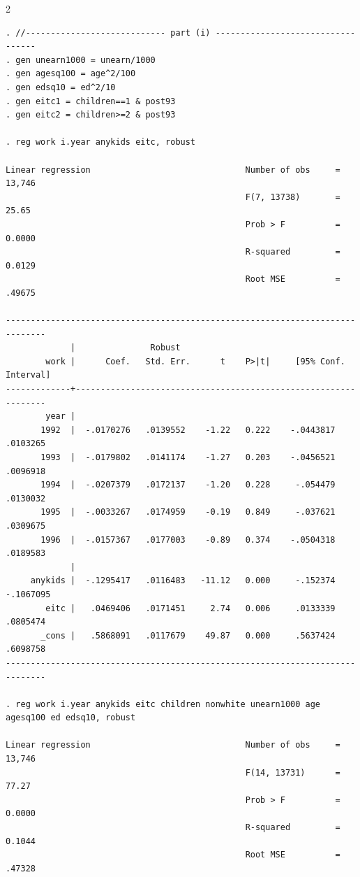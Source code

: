 \documentclass{article}
\newenvironment{changemargin}[2]{%
\begin{list}{}{%
\setlength{\topsep}{0pt}%
\setlength{\leftmargin}{#1}%
\setlength{\rightmargin}{#2}%
\setlength{\listparindent}{\parindent}%
\setlength{\itemindent}{\parindent}%
\setlength{\parsep}{\parskip}%
}%
\item[]}{\end{list}}
\begin{document}
\begin{changemargin}{-0.5in}{-0.5in}
\begin{multicols}{2}
\begin{verbatim}
. //---------------------------- part (i) ----------------------------------
. gen unearn1000 = unearn/1000  
. gen agesq100 = age^2/100 
. gen edsq10 = ed^2/10   
. gen eitc1 = children==1 & post93  
. gen eitc2 = children>=2 & post93

. reg work i.year anykids eitc, robust

Linear regression                               Number of obs     =     13,746
                                                F(7, 13738)       =      25.65
                                                Prob > F          =     0.0000
                                                R-squared         =     0.0129
                                                Root MSE          =     .49675

------------------------------------------------------------------------------
             |               Robust
        work |      Coef.   Std. Err.      t    P>|t|     [95% Conf. Interval]
-------------+----------------------------------------------------------------
        year |
       1992  |  -.0170276   .0139552    -1.22   0.222    -.0443817    .0103265
       1993  |  -.0179802   .0141174    -1.27   0.203    -.0456521    .0096918
       1994  |  -.0207379   .0172137    -1.20   0.228     -.054479    .0130032
       1995  |  -.0033267   .0174959    -0.19   0.849     -.037621    .0309675
       1996  |  -.0157367   .0177003    -0.89   0.374    -.0504318    .0189583
             |
     anykids |  -.1295417   .0116483   -11.12   0.000     -.152374   -.1067095
        eitc |   .0469406   .0171451     2.74   0.006     .0133339    .0805474
       _cons |   .5868091   .0117679    49.87   0.000     .5637424    .6098758
------------------------------------------------------------------------------

. reg work i.year anykids eitc children nonwhite unearn1000 age agesq100 ed edsq10, robust

Linear regression                               Number of obs     =     13,746
                                                F(14, 13731)      =      77.27
                                                Prob > F          =     0.0000
                                                R-squared         =     0.1044
                                                Root MSE          =     .47328


\end{verbatim}
\end{multicols}
\end{changemargin}
\end{document}
